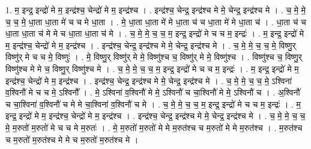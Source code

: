 \documentclass[17pt]{extarticle}
\begin{document}
1. म॒ इन्द्र॒ इन्द्रो॑ मे म॒ इन्द्र॑श्च॒ चेन्द्रो॑ मे म॒ इन्द्र॑श्च । . इन्द्र॑श्च॒ चेन्द्र॒ इन्द्र॑श्च मे मे॒ चेन्द्र॒ इन्द्र॑श्च मे । . च॒ मे॒ मे॒ च॒ च॒ मे॒ धा॒ता धा॒ता मे॑ च च मे धा॒ता । . मे॒ धा॒ता धा॒ता मे॑ मे धा॒ता च॑ च धा॒ता मे॑ मे धा॒ता च॑ । . धा॒ता च॑ च धा॒ता धा॒ता च॑ मे मे च धा॒ता धा॒ता च॑ मे । . च॒ मे॒ मे॒ च॒ च॒ म॒ इन्द्र॒ इन्द्रो॑ मे च च म॒ इन्द्रः॑ । . म॒ इन्द्र॒ इन्द्रो॑ मे म॒ इन्द्र॑श्च॒ चेन्द्रो॑ मे म॒ इन्द्र॑श्च । . इन्द्र॑श्च॒ चेन्द्र॒ इन्द्र॑श्च मे मे॒ चेन्द्र॒ इन्द्र॑श्च मे । . च॒ मे॒ मे॒ च॒ च॒ मे॒ विष्णु॒र् विष्णु॑र् मे च च मे॒ विष्णुः॑ । . मे॒ विष्णु॒र् विष्णु॑र् मे मे॒ विष्णु॑श्च च॒ विष्णु॑र् मे मे॒ विष्णु॑श्च । . विष्णु॑श्च च॒ विष्णु॒र् विष्णु॑श्च मे मे च॒ विष्णु॒र् विष्णु॑श्च मे । . च॒ मे॒ मे॒ च॒ च॒ म॒ इन्द्र॒ इन्द्रो॑ मे च च म॒ इन्द्रः॑ । . म॒ इन्द्र॒ इन्द्रो॑ मे म॒ इन्द्र॑श्च॒ चेन्द्रो॑ मे म॒ इन्द्र॑श्च । . इन्द्र॑श्च॒ चेन्द्र॒ इन्द्र॑श्च मे मे॒ चेन्द्र॒ इन्द्र॑श्च मे । . च॒ मे॒ मे॒ च॒ च॒ मे॒ ऽश्विना॑ व॒श्विनौ॑ मे च च मे॒ ऽश्विनौ᳚ । . मे॒ ऽश्विना॑ व॒श्विनौ॑ मे मे॒ ऽश्विनौ॑ च चा॒श्विनौ॑ मे मे॒ ऽश्विनौ॑ च । . अ॒श्विनौ॑ च चा॒श्विना॑ व॒श्विनौ॑ च मे मे चा॒श्विना॑ व॒श्विनौ॑ च मे । . च॒ मे॒ मे॒ च॒ च॒ म॒ इन्द्र॒ इन्द्रो॑ मे च च म॒ इन्द्रः॑ । . म॒ इन्द्र॒ इन्द्रो॑ मे म॒ इन्द्र॑श्च॒ चेन्द्रो॑ मे म॒ इन्द्र॑श्च । . इन्द्र॑श्च॒ चेन्द्र॒ इन्द्र॑श्च मे मे॒ चेन्द्र॒ इन्द्र॑श्च मे । . च॒ मे॒ मे॒ च॒ च॒ मे॒ म॒रुतो॑ म॒रुतो॑ मे च च मे म॒रुतः॑ । . मे॒ म॒रुतो॑ म॒रुतो॑ मे मे म॒रुत॑श्च च म॒रुतो॑ मे मे म॒रुत॑श्च । . म॒रुत॑श्च च म॒रुतो॑ म॒रुत॑श्च मे मे च म॒रुतो॑ म॒रुत॑श्च मे । \newline
\end{document}
